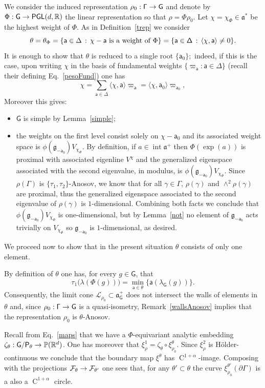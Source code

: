 \documentclass[AHL,Unicode,longabstracts,MathTools]{cedram}
\DeclareMathOperator{\class}{C}
\DeclareMathOperator{\inte}{int}
\DeclareMathOperator{\PGL}{{\mathsf{PGL}}}
\renewcommand{\sf}[1]{{\mathsf{#1}}}
\newcommand{\sroot}{{\sf{a}}}
\newcommand{\sfG}{\sf{G}}
\newcommand{\G}{\sf{\Gamma}}
\newcommand{\calF}{\mathcal{F}}
\newcommand{\calL}{\mathcal{L}}
\newcommand{\R}{\mathbb{R}}
\renewcommand{\P}{\mathbb{P}}
\newcommand{\g}{\gamma}
\renewcommand{\t}{\theta}
\newcommand{\bord}{\partial}
\newcommand{\simple}{{\sf \Delta}}
\newcommand{\Fund}{\Phi}
\newcommand{\peso}{\varpi}
\newcommand{\slroot}{{\tau}}
\renewcommand{\/}{\backslash}
\newcommand{\<}{\langle}
\renewcommand{\>}{\rangle}
\renewcommand{\ge}{\mathfrak{g}}
\renewcommand{\a}{\mathfrak{a}}
\renewcommand*{\to}{\mathchoice{\longrightarrow}{\rightarrow}{\rightarrow}{\rightarrow}}
\let\originalleft\left
\let\originalright\right
\renewcommand{\left}{\mathopen{}\mathclose\bgroup\originalleft}
\renewcommand{\right}{\aftergroup\egroup\originalright}
\begin{document}
We consider the induced representation $\rho_0:\G\to\sfG$ and denote by $\Fund:\sfG\to\PGL(d,\R)$ the linear representation so that $\rho=\Fund\rho_0$. Let $\chi=\chi_\Fund\in\a^*$ be the highest weight of $\Fund$. As in Definition~\ref{trep} we consider
\[
\t=\t_\Fund=\left\{\sroot\in\Delta\,:\, \chi-\sroot \text{ is a weight of }\Fund \right\}
=\left\{\sroot\in\simple\,:\,\<\chi,\sroot\>\neq0\right\}.
\]
It is enough to show that $\t$ is reduced to a single root $\{\sroot_0\};$ indeed, if this is the case, upon writing $\chi$ in the basis of fundamental weights $\{\peso_\sroot:\sroot\in\simple\}$ (recall their defining Eq.~\eqref{pesoFund}) one has
\[
\chi=\sum_{\sroot\in\simple}\<\chi,\sroot\>\peso_\sroot=\<\chi,\sroot_0\>\peso_{\sroot_0},
\]
Moreover this gives:
\begin{itemize}
\item $\sfG$ is simple by Lemma~\ref{simple};
\item the weights on the first level consist solely on $\chi-\sroot_0$ and its associated weight space is $\phi(\ge_{-\sroot_0})V_{\chi_\Fund}$. By definition, if $a\in\inte\a^+$ then $\Fund(\exp(a))$ is proximal with associated eigenline $V^\chi$ and the generalized eigenspace associated with the second eigenvalue, in modulus, is $\phi(\ge_{-\sroot_0})V_{\chi_\Fund}$. Since $\rho(\G)$ is $\{\slroot_1,\slroot_2\}$-Anosov, we know that for all $\g\in\G$, $\rho(\g)$ and $\wedge^2\rho(\g)$ are proximal, thus the generalized eigenspace associated to the second eigenvalue of $\rho(\g)$ is $1$-dimensional. Combining both facts we conclude that $\phi(\ge_{-\sroot_0})V_{\chi_\Fund}$ is one-dimensional, but by Lemma~\ref{not} no element of $\ge_{-\sroot_0}$ acts trivially on $V_{\chi_\Fund}$ so $\ge_{-\sroot_0}$ is $1$-dimensional, as desired.
\end{itemize}



We proceed now to show that in the present situation $\t$ consists of only one element.

By definition of $\t$ one has, for every $g\in\sfG$, that
\[
\slroot_1\bigl(\lambda(\Fund(g))\bigr)=\min_{\sroot\in\theta}\bigl\{\sroot(\lambda_\sfG(g))\bigr\}.
\]
Consequently, the limit cone $\calL_{\rho_0}\subset\a^+_\sfG$ does not intersect the walls of elements in $\t$ and, since $\rho_0:\G\to\sfG$ is a quasi-isometry, Remark~\ref{wallsAnosov} implies that the representation $\rho_0$ is $\t$-Anosov.

Recall from Eq.~\eqref{maps} that we have a $\Fund$-equivariant analytic embedding $\zeta_\t:\sfG/\sf P_{\theta}\to \P(\R^{d})$. One has moreover that $\xi^1_\rho=\zeta_\t\circ\xi^\t_{\rho_0}$. Since $\xi^2_\rho$ is H\"older-continuous we conclude that the boundary map $\xi^\theta$ has $\class^{1+\alpha}$-image. Composing with the projections $\calF_\t\to\calF_{\t'}$ one sees that, for any $\t'\subset\t$ the curve $\xi_{\rho_0}^{\t'}(\bord\G)$ is a also a $\class^{1+\alpha}$ circle.
\end{document}
